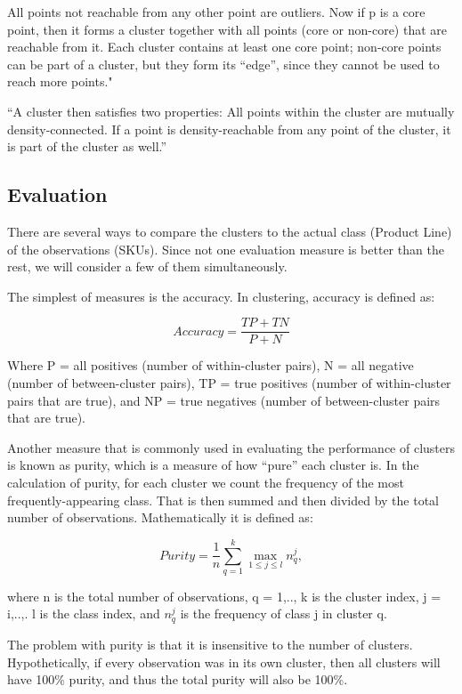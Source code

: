 \documentclass[]{article}
\begin{document}
All points not reachable from any other point are outliers. Now if p is
a core point, then it forms a cluster together with all points (core or
non-core) that are reachable from it. Each cluster contains at least one
core point; non-core points can be part of a cluster, but they form its
``edge'', since they cannot be used to reach more points."

``A cluster then satisfies two properties: All points within the cluster
are mutually density-connected. If a point is density-reachable from any
point of the cluster, it is part of the cluster as well.''

\subsection{Evaluation}\label{evaluation}

There are several ways to compare the clusters to the actual class
(Product Line) of the observations (SKUs). Since not one evaluation
measure is better than the rest, we will consider a few of them
simultaneously.

The simplest of measures is the accuracy. In clustering, accuracy is
defined as:

\[
Accuracy = \frac{TP + TN}{P + N}
\]

Where P = all positives (number of within-cluster pairs), N = all
negative (number of between-cluster pairs), TP = true positives (number
of within-cluster pairs that are true), and NP = true negatives (number
of between-cluster pairs that are true).

Another measure that is commonly used in evaluating the performance of
clusters is known as purity, which is a measure of how ``pure'' each
cluster is. In the calculation of purity, for each cluster we count the
frequency of the most frequently-appearing class. That is then summed
and then divided by the total number of observations. Mathematically it
is defined as:

\[
Purity = \frac{1}{n}
  \sum_{q=1}^k \max_{1 \leq j \leq l} n_q^j ,
\]

where n is the total number of observations, q = 1,.., k is the cluster
index, j = i,..,. l is the class index, and \(n^{j}_{q}\) is the
frequency of class j in cluster q.

The problem with purity is that it is insensitive to the number of
clusters. Hypothetically, if every observation was in its own cluster,
then all clusters will have 100\% purity, and thus the total purity will
also be 100\%.
\end{document}
